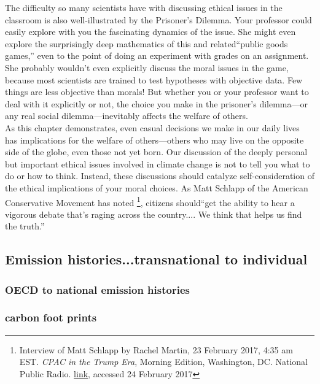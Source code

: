 \documentclass[amstex,12pt]{book}
\begin{document}
The difficulty so many scientists have with discussing ethical issues in the classroom is also well-illustrated by the Prisoner's Dilemma. Your professor could easily explore with you the fascinating dynamics of the issue. She might even explore the surprisingly deep mathematics of this and related``public goods games,'' even to the point of doing an experiment with grades on an assignment. She probably wouldn't even explicitly discuss the moral issues in the game, because most scientists are trained to test hypotheses with objective data. Few things are less objective than morals! But whether you or your professor want to deal with it explicitly or not, the choice you make in the prisoner's dilemma---or any real social dilemma---inevitably affects the welfare of others.\\

As this chapter demonstrates, even casual decisions we make in our daily lives has implications for the welfare of others---others who may live on the opposite side of the globe, even those not yet born. Our discussion of the deeply personal but important ethical issues involved in climate change is not to tell you what to do or how to think. Instead, these discussions should catalyze self-consideration of the ethical implications of your moral choices. As Matt Schlapp of the American Conservative Movement has noted \footnote{Interview of Matt Schlapp by Rachel Martin, 23 February 2017, 4:35 am EST. \textit{CPAC in the Trump Era}, Morning Edition, Washington, DC. National Public Radio. \href{http://www.npr.org/2017/02/23/516787809/cpac-in-the-trump-era}{link}, accessed 24 February 2017}, citizens should``get the ability to hear a vigorous debate that's raging across the country.... We think that helps us find the truth.''  \\

\subsection{Emission histories...transnational to individual}
\subsubsection{OECD to national emission histories}
\subsubsection{carbon foot prints}
\end{document}
